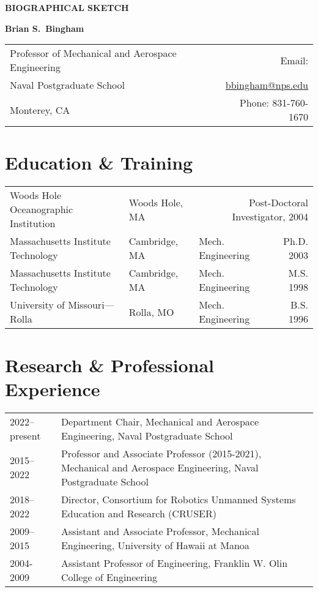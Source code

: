 \documentclass[12pt]{article}
\begin{document}
\pagestyle{CVfooter}

\noindent \textbf{\uppercase{Biographical Sketch}}
\vspace{2mm}

\noindent \textbf{Brian S.\ Bingham}
\vspace{1mm}

\noindent\begin{tabular*}{\textwidth}{@{\extracolsep{\fill}}l r}
Professor of Mechanical and Aerospace Engineering & Email: \\
Naval Postgraduate School & \href{mailto:bbignham@nps.edu}{bbingham@nps.edu} \\
Monterey, CA &  Phone: 831-760-1670\\
\hline
\end{tabular*}

\section{Education \& Training}

\begin{tabular}{l l l r}
Woods Hole Oceanographic Institution & Woods Hole, MA &  \multicolumn{2}{r}{Post-Doctoral Investigator, 2004}\\
Massachusetts Institute Technology & Cambridge, MA & Mech. Engineering & Ph.D.  2003 \\
Massachusetts Institute Technology & Cambridge, MA & Mech. Engineering & M.S.  1998 \\
University of Missouri—Rolla & Rolla, MO & Mech. Engineering & B.S. 1996 \\
\end{tabular}

\section{Research \& Professional Experience}

\begin{tabular}{l p{5in}}
2022--present & Department Chair, Mechanical and Aerospace Engineering, \newline Naval Postgraduate School \\
2015--2022 & Professor and Associate Professor (2015-2021), Mechanical and Aerospace Engineering, Naval Postgraduate School \\
2018--2022 & Director, Consortium for Robotics Unmanned Systems Education and \newline Research (CRUSER) \\
2009--2015 & Assistant and Associate Professor,  Mechanical Engineering, \newline University of Hawaii at Manoa \\
2004-2009  & Assistant Professor of Engineering, \newline Franklin W. Olin College of Engineering \\
\end{tabular}
\end{document}

